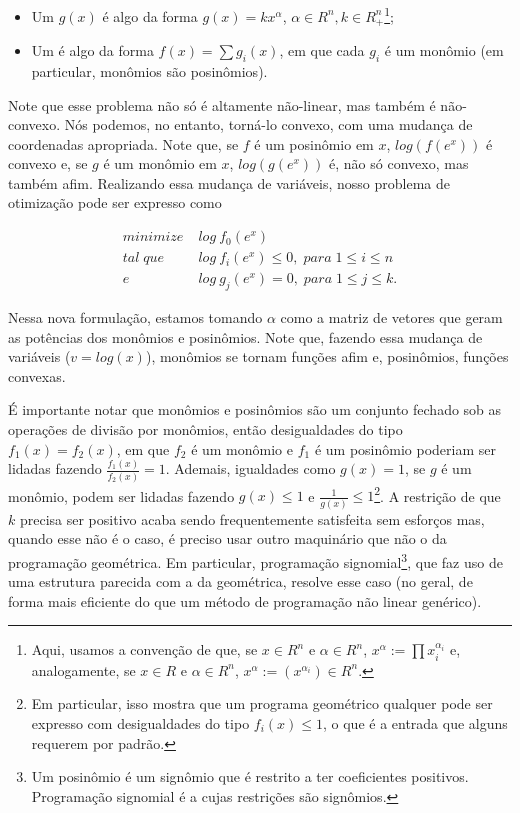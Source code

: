 \documentclass{article}
\begin{document}
\begin{itemize}
\item Um  $g(x)$ é algo da forma $g(x) =
  kx^{\alpha}$, $\alpha \in R^n, k \in R^n_{+}$\footnote{Aqui, usamos
    a convenção de que, se $x \in R^n$ e $\alpha \in R^n$, $x^{\alpha}
    := \prod x_i^{\alpha_i}$ e, analogamente, se $x \in R$ e $\alpha \in R^n$, $x^\alpha :=
    (x^{\alpha_i}) \in R^n$.};
\item Um  é algo da forma $f(x) = \sum g_i(x)$,
  em que cada $g_i$ é um monômio (em particular, monômios são
  posinômios).
\end{itemize}

Note que esse problema não só é altamente não-linear, mas também é
não-convexo. Nós podemos, no entanto, torná-lo convexo, com uma
mudança de coordenadas apropriada. Note que, se $f$ é um posinômio em
$x$, $log(f(e^x))$ é convexo e, se $g$ é um monômio em $x$,
$log(g(e^x))$ é, não só convexo, mas também afim. Realizando essa
mudança de variáveis, nosso problema de otimização pode ser expresso
como


\begin{align*}
  minimize\; & log\ f_0 (e^x)\\
  tal\; que\; & log\ f_i (e^x) \leq 0,\; para\; 1 \leq i \leq n\\
  e\; & log\ g_j (e^x) = 0,\; para\; 1 \leq j \leq k.
\end{align*}

Nessa nova formulação, estamos tomando $\alpha$ como a matriz de
vetores que geram as potências dos monômios e posinômios. Note que,
fazendo essa mudança de variáveis ($v = log(x)$), monômios se tornam
funções afim e, posinômios, funções convexas.

É importante notar que monômios e posinômios são um conjunto fechado
sob as operações de divisão por monômios, então desigualdades do tipo
$f_1(x) = f_2(x)$, em que $f_2$ é um monômio e $f_1$ é um posinômio
poderiam ser lidadas fazendo $\frac{f_1(x)}{f_2(x)} = 1$. Ademais,
igualdades como $g(x) = 1$, se $g$ é um monômio, podem ser lidadas
fazendo $g(x) \leq 1$ e $\frac{1}{g(x)} \leq 1$\footnote{Em
  particular, isso mostra que um programa geométrico qualquer pode ser
  expresso com desigualdades do tipo $f_i(x) \leq 1$, o que é a
  entrada que alguns  requerem por padrão.}. A
restrição de que $k$ precisa ser positivo acaba sendo frequentemente
satisfeita sem esforços mas, quando esse não é o caso, é preciso
usar outro maquinário que não o da programação geométrica. Em
particular, programação signomial\footnote{Um posinômio é um signômio
  que é restrito a ter coeficientes positivos. Programação signomial é
  a cujas restrições são signômios.}, que faz uso de uma estrutura
parecida com a da geométrica, resolve esse caso (no geral, de forma
mais eficiente do que um método de programação não linear
genérico).
\end{document}
